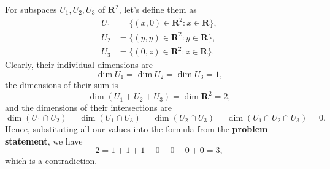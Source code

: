 \documentclass{article}
\begin{document}
For subspaces $U_1,U_2,U_3$ of $\mathbf{R}^2$, let's define them as
\begin{align*}
    U_1&=\{ (x,0)\in\mathbf{R}^2 :x\in\mathbf{R} \},\\
    U_2&=\{ (y,y)\in\mathbf{R}^2 :y\in\mathbf{R} \},\\
    U_3&=\{ (0,z)\in\mathbf{R}^2 :z\in\mathbf{R} \}.
\end{align*}
Clearly, their individual dimensions are
\[\dim U_1=\dim U_2=\dim U_3=1,\]
the dimensions of their sum is
\[\dim(U_1+U_2+U_3)=\dim \mathbf{R}^2=2,\]
and the dimensions of their intersections are
\[\dim(U_1\cap U_2)=\dim(U_1\cap U_3)=\dim(U_2\cap U_3)=\dim(U_1\cap U_2\cap U_3)=0.\]
Hence, substituting all our values into the formula from the \textbf{problem statement}, we have
\[2=1+1+1-0-0-0+0=3,\]
which is a contradiction.
\end{document}

